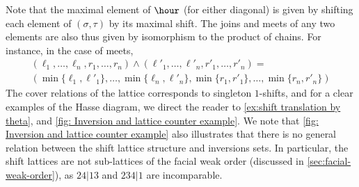 \documentclass{amsart}
\theoremstyle{definition}
\begin{document}
Note that the maximal element of $\hour$ (for either diagonal) is given by shifting each element of $(\sigma,\tau)$ by its maximal shift.
The joins and meets of any two elements are also thus given by isomorphism to the product of chains.
For instance, in the case of meets,
\begin{multline*}
	(\ell_1,\ldots,\ell_n,r_1,\ldots,r_n)\land (\ell'_1,\ldots,\ell'_n,r'_1,\ldots,r'_n) = \\ (\min\{\ell_1,\ell'_1\},\ldots,\min\{\ell_n,\ell'_n\},\min\{r_1,r'_1\},\ldots,\min\{r_n,r'_n\})
\end{multline*}
The cover relations of the lattice corresponds to singleton $1$-shifts, and for a clear examples of the Hasse diagram, we direct the reader to \cref{ex:shift translation by theta}, and \cref{fig: Inversion and lattice counter example}.
We note that \cref{fig: Inversion and lattice counter example} also illustrates that there is no general relation between the shift lattice structure and inversions sets.
In particular, the shift lattices are not sub-lattices of the facial weak order (discussed in \cref{sec:facial-weak-order}), as $24|13$ and $234|1$ are incomparable.
\end{document}
